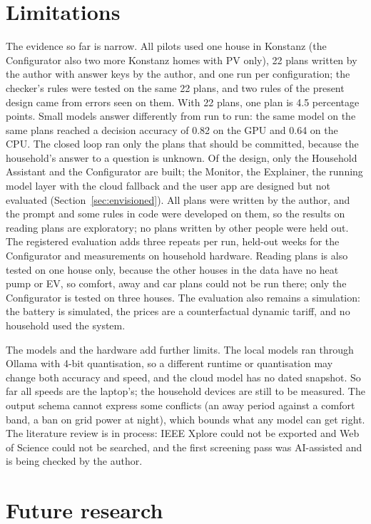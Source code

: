 \documentclass[12pt,a4paper]{report}
\begin{document}
\section{Limitations}
\label{sec:limitations}

The evidence so far is narrow. All pilots used one house in Konstanz
(the Configurator also two more Konstanz homes with PV only),
22 plans written by the author with answer keys by the author, and one
run per configuration; the checker's rules were tested on the same 22
plans, and two rules of the present design came from errors seen on
them. With 22 plans, one plan is 4.5 percentage points. Small models
answer differently from run to run: the same model on the same plans
reached a decision accuracy of 0.82 on the GPU and 0.64 on the CPU. The
closed loop ran only the plans that should be committed, because the
household's answer to a question is unknown. Of the design, only the
Household Assistant and the Configurator are built; the Monitor, the
Explainer, the running model layer with the cloud fallback and the user
app are designed but not evaluated (Section~\ref{sec:envisioned}).
All plans were written by the author, and the prompt and some rules in
code were developed on them, so the results on reading plans are
exploratory; no plans written by other people were held out. The
registered evaluation adds three repeats per run, held-out weeks for
the Configurator and measurements on household hardware. Reading plans
is also tested on one house only, because the other houses in the data have
no heat pump or EV, so comfort, away and car plans could not be run
there; only the Configurator is tested on three houses. The evaluation
also remains a simulation: the battery is simulated, the prices are a counterfactual
dynamic tariff, and no household used the system.

The models and the hardware add further limits. The local models ran
through Ollama with 4-bit quantisation, so a different runtime or
quantisation may change both accuracy and speed, and the cloud model
has no dated snapshot. So far all speeds are the laptop's; the
household devices are still to be measured. The output schema cannot
express some conflicts (an away period against a comfort band, a ban on
grid power at night), which bounds what any model can get right. The
literature review is in process: IEEE Xplore could not be exported and
Web of Science could not be searched, and the first screening pass was
AI-assisted and is being checked by the author.

\section{Future research}
\label{sec:future}
\end{document}
